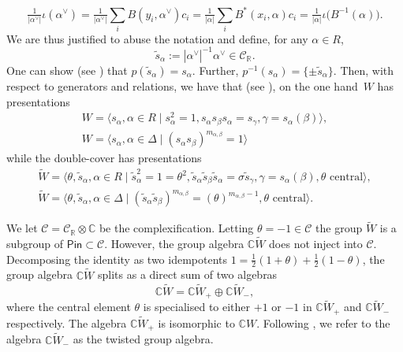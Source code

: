 \documentclass[pdftex]{sigma}
\numberwithin{equation}{section}
\newcommand{\bbc}{\mathbb{C}}
\newcommand{\bbr}{\mathbb{R}}
\newcommand{\Cc}{\mathcal{C}}
\newcommand{\Pin}{\mathsf{Pin}}
\begin{document}
\[
\tfrac{1}{|\alpha^\vee|}\iota(\alpha^\vee)
= \tfrac{1}{|\alpha^\vee|}\sum_i B(y_i,\alpha^\vee) c_i
= \tfrac{1}{|\alpha|}\sum_i B^*(x_i,\alpha) c_i
= \tfrac{1}{|\alpha|}\iota\big(B^{-1}(\alpha)\big).
\]
We are thus justified to abuse the notation and define, for any $\alpha\in R$, \[\tilde{s}_\alpha := |\alpha^\vee|^{-1}\alpha^\vee \in \mathcal{C}_\bbr.\]
One can show (see \cite[Proposition~2.6]{M76}) that $p(\tilde{s}_\alpha) = s_\alpha$. Further, $p^{-1}(s_\alpha) = \{\pm \tilde{s}_\alpha\}$. Then, with respect to generators and relations, we have that (see \cite[Theorem~4.2]{M76}), on the one hand~$W$ has presentations
\begin{gather*}
W = \langle s_\alpha,\alpha\in R\mid s_\alpha^2=1,s_\alpha s_\beta s_\alpha = s_\gamma,\gamma = s_\alpha(\beta)\rangle,
\\
W = \langle s_\alpha,\alpha\in \Delta \mid (s_\alpha s_\beta)^{m_{\alpha,\beta}} = 1 \rangle
\end{gather*}
while the double-cover has presentations
\begin{gather}\label{e:PinPresentation}
\tilde{W} = \langle \theta, \tilde{s}_\alpha,\alpha\in R\mid \tilde{s}_\alpha^2=1=\theta^2,\tilde{s}_\alpha \tilde{s}_\beta \tilde{s}_\alpha = \sigma\tilde{s}_\gamma,\gamma = s_\alpha(\beta), \theta \text{ central}\rangle,\\
\label{e:PinPresentationmalpha}
\tilde{W} = \langle \theta, \tilde{s}_\alpha,\alpha\in \Delta \mid (\tilde{s}_\alpha \tilde{s}_\beta)^{m_{\alpha,\beta}} = (\theta)^{m_{\alpha,\beta}-1}, \theta \text{ central}\rangle.
\end{gather}

 We let $\mathcal{C} = \mathcal{C}_\bbr\otimes \bbc$ be the complexification. Letting $\theta = -1 \in \Cc$ the group $\tilde{W}$ is a subgroup of $\Pin \subset\Cc$. However, the group algebra $\mathbb{C}\tilde{W}$ does not inject into $\Cc$. Decomposing the identity as two idempotents $1 = \tfrac{1}{2}(1+\theta) + \tfrac{1}{2}(1-\theta)$, the group algebra $\mathbb{C}\tilde{W}$ splits as a direct sum of two algebras
 \begin{equation}\label{eq::twistedgroupalg} \mathbb{C}\tilde{W} =\mathbb{C}\tilde{W}_+ \oplus \mathbb{C}\tilde{W}_-,
 \end{equation}
 where the central element $\theta$ is specialised to either $+1$ or $-1$ in $\mathbb{C}\tilde{W}_+$ and $\mathbb{C}\tilde{W}_-$ respectively. The algebra $\mathbb{C}\tilde{W}_+$ is isomorphic to $\mathbb{C}W$. Following \cite{K05}, we refer to the algebra $\mathbb{C}\tilde{W}_-$ as the twisted group algebra.
\end{document}
